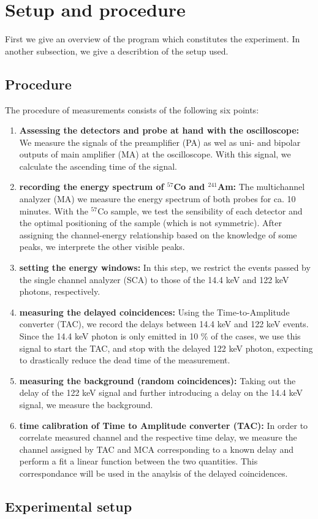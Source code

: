 \section{Setup and procedure}
First we give an overview of the program which constitutes the experiment. In another subsection, 
we give a describtion of the setup used. 
\subsection{Procedure}
The procedure of measurements consists of the following six points:
\begin{enumerate}
    \item 
        \textbf{Assessing the detectors and probe at hand with the oscilloscope:}
        We measure the signals of the preamplifier (PA) as wel as uni- and bipolar outputs of 
        main amplifier (MA) at the oscilloscope. With this signal, we calculate the ascending time 
        of the signal.
    \item 
        \textbf{recording the energy spectrum of $^{57}$Co and $^{241}$Am:}
        The multichannel analyzer (MA) we measure the energy spectrum of both probes 
        for ca. 10 minutes. With the $^{57}$Co sample, we test the sensibility of each detector
        and the optimal positioning of the sample (which is not symmetric). After assigning the 
        channel-energy relationship based on the knowledge of some peaks, we interprete the other visible peaks.
    \item
        \textbf{setting the energy windows:}
        In this step, we restrict the events passed by the single channel analyzer (SCA) to those 
        of the 14.4 keV and 122 keV photons, respectively.
    \item
        \textbf{measuring the delayed coincidences:}
        Using the Time-to-Amplitude converter (TAC), we record the delays between 14.4 keV and 122 keV 
        events. Since the 14.4 keV photon is only emitted in 10 \% of the cases, we use this signal to start the 
        TAC, and stop with the delayed 122 keV photon, expecting to drastically reduce the dead time of the 
        measurement.
    \item
        \textbf{measuring the background (random coincidences):}
        Taking out the delay of the 122 keV signal and further introducing a delay on the 14.4 keV signal, 
        we measure the background. 
    \item
        \textbf{time calibration of Time to Amplitude converter (TAC):}
        In order to correlate measured channel and the respective time delay, we measure the channel 
        assigned by TAC and MCA corresponding to a known delay and perform a fit a linear function between 
        the two quantities. This correspondance will be used in the anaylsis of the delayed coincidences. 
\end{enumerate}







\subsection{Experimental setup}


